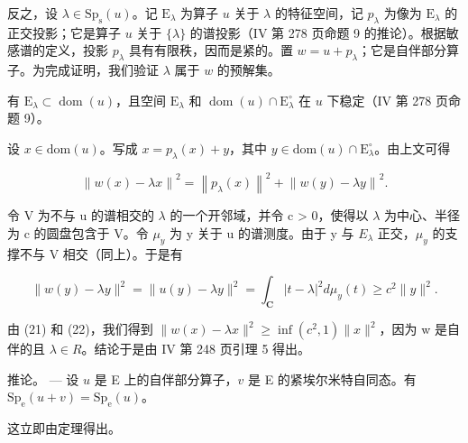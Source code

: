 反之，设 \(\lambda \in \mathrm{Sp}_{\mathrm{s}}(u)\)。记 \(\mathrm{E}_{\lambda}\) 为算子 \(u\) 关于 \(\lambda\) 的特征空间，记 \(p_{\lambda}\) 为像为 \(\mathrm{E}_{\lambda}\) 的正交投影；它是算子 \(u\) 关于 \(\{\lambda\}\) 的谱投影（IV 第 278 页命题 9 的推论）。根据敏感谱的定义，投影 \(p_{\lambda}\) 具有有限秩，因而是紧的。置 \(w = u + p_{\lambda}\)；它是自伴部分算子。为完成证明，我们验证 \(\lambda\) 属于 \(w\) 的预解集。

有 \(\mathrm{E}_{\lambda} \subset \operatorname{dom}(u)\)，且空间 \(\mathrm{E}_{\lambda}\) 和 \(\operatorname{dom}(u) \cap \mathrm{E}_{\lambda}^{\circ}\) 在 \(u\) 下稳定（IV 第 278 页命题 9）。

设 \(x \in \text{dom}(u)\)。写成 \(x = p_{\lambda}(x) + y\)，其中 \(y \in \text{dom}(u) \cap \text{E}_{\lambda}^{\circ}\)。由上文可得

\[
\left\| w (x) - \lambda x \right\| ^ {2} = \left\| p _ {\lambda} (x) \right\| ^ {2} + \left\| w (y) - \lambda y \right\| ^ {2}.\tag{21}
\]

令 V 为不与 u 的谱相交的 \(\lambda\) 的一个开邻域，并令 c > 0，使得以 \(\lambda\) 为中心、半径为 c 的圆盘包含于 V。令 \(\mu_{y}\) 为 y 关于 u 的谱测度。由于 y 与 \(E_{\lambda}\) 正交，\(\mu_{y}\) 的支撑不与 V 相交（同上）。于是有

\[
\| w (y) - \lambda y \| ^ {2} = \| u (y) - \lambda y \| ^ {2} = \int_ {\mathbf {C}} | t - \lambda | ^ {2} d \mu_ {y} (t) \geqslant c ^ {2} \| y \| ^ {2}.\tag{22}
\]

由 (21) 和 (22)，我们得到 \(\|w(x)-\lambda x\|^{2}\geqslant\inf(c^{2},1)\|x\|^{2}\)，因为 w 是自伴的且 \(\lambda\in R\)。结论于是由 IV 第 248 页引理 5 得出。

推论。 --- 设 \(u\) 是 E 上的自伴部分算子，\(v\) 是 E 的紧埃尔米特自同态。有 \(\mathrm{Sp}_{\mathrm{e}}(u + v) = \mathrm{Sp}_{\mathrm{e}}(u)\)。

这立即由定理得出。

